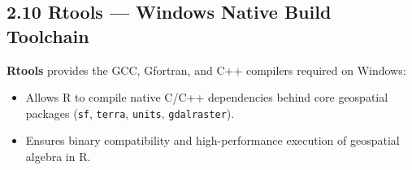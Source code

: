 \documentclass[10pt,a4paper]{article}
\begin{document}
\subsection*{2.10 Rtools — Windows Native Build Toolchain}
\textbf{Rtools} provides the GCC, Gfortran, and C++ compilers required on Windows:
\begin{itemize}[leftmargin=1.5em, itemsep=2pt, topsep=2pt]
  \item Allows R to compile native C/C++ dependencies behind core geospatial packages (\texttt{sf}, \texttt{terra}, \texttt{units}, \texttt{gdalraster}).
  \item Ensures binary compatibility and high-performance execution of geospatial algebra in R.
\end{itemize}
\end{document}
